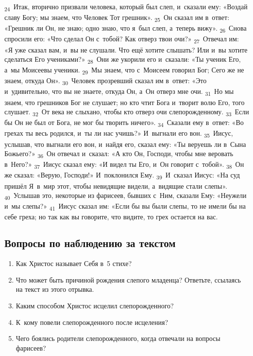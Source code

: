 \documentclass[a4paper,12pt]{article}
\begin{document}
\textsubscript{24}~Итак, вторично призвали человека, который был слеп, и~сказали ему: «Воздай славу Богу; мы знаем, что Человек Тот грешник».
\textsubscript{25}~Он сказал им в~ответ: «Грешник ли Он, не знаю; одно знаю, что я~был слеп, а~теперь вижу».
\textsubscript{26}~Снова спросили его: «Что сделал Он с~тобой? Как отверз твои очи?»
\textsubscript{27}~Отвечал им: «Я уже сказал вам, и~вы не слушали. Что ещё хотите слышать? Или и~вы хотите сделаться Его учениками?»
\textsubscript{28}~Они же укорили его и~сказали: «Ты ученик Его, а~мы Моисеевы ученики.
\textsubscript{29}~Мы знаем, что с~Моисеем говорил Бог; Сего же не знаем, откуда Он».
\textsubscript{30}~Человек прозревший сказал им в~ответ: «Это и~удивительно, что вы не знаете, откуда Он, а~Он отверз мне очи.
\textsubscript{31}~Но мы знаем, что грешников Бог не слушает; но кто чтит Бога и~творит волю Его, того слушает.
\textsubscript{32}~От века не слыхано, чтобы кто отверз очи слепорожденному.
\textsubscript{33}~Если бы Он не был от Бога, не мог бы творить ничего».
\textsubscript{34}~Сказали ему в~ответ: «Во грехах ты весь родился, и~ты ли нас учишь?» И~выгнали его вон.
\textsubscript{35}~Иисус, услышав, что выгнали его вон, и~найдя его, сказал ему: «Ты веруешь ли в~Сына Божьего?»
\textsubscript{36}~Он отвечал и~сказал: «А кто Он, Господи, чтобы мне веровать в~Него?»
\textsubscript{37}~Иисус сказал ему: «И видел ты Его, и~Он говорит с~тобой».
\textsubscript{38}~Он же сказал: «Верую, Господи!» И~поклонился Ему.
\textsubscript{39}~И~сказал Иисус: «На суд пришёл Я~в~мир этот, чтобы невидящие видели, а~видящие стали слепы».
\textsubscript{40}~Услышав это, некоторые из фарисеев, бывших с~Ним, сказали Ему: «Неужели и~мы слепы?»
\textsubscript{41}~Иисус сказал им: «Если бы вы были слепы, то не имели бы на себе греха; но так как вы говорите, что видите, то грех остается на вас. 

\subsection*{Вопросы по наблюдению за текстом}
\begin{enumerate}
    \item Как Христос называет Себя в~5 стихе? 
    
    \myline
    
    \item Что может быть причиной рождения слепого младенца? Ответьте, ссылаясь на текст из этого отрывка. 
    
    \myline
    
    \myline
    \item Каким способом Христос исцелил слепорожденного? 
    
    \myline
    
    \myline
    \item К~кому повели слепорожденного после исцеления? 
    
    \myline
    
    \myline
    \item Чего боялись родители слепорожденного, когда отвечали на вопросы фарисеев? 
    
    \myline
    
    \myline
\end{enumerate}
\end{document}
